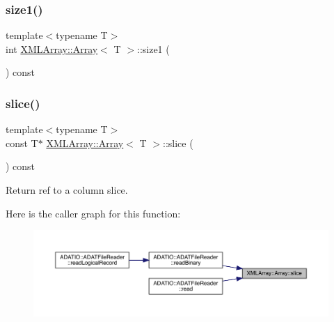 \mbox{\label{classXMLArray_1_1Array_a33e863988af56d045439d31058088c8c}} 
\subsubsection{\texorpdfstring{size1()}{size1()}\hspace{0.1cm}{\footnotesize\ttfamily [2/2]}}
{\footnotesize\ttfamily template$<$typename T$>$ \\
int \mbox{\hyperlink{classXMLArray_1_1Array}{X\+M\+L\+Array\+::\+Array}}$<$ T $>$\+::size1 (\begin{DoxyParamCaption}{ }\end{DoxyParamCaption}) const\hspace{0.3cm}{\ttfamily [inline]}}

\mbox{\label{classXMLArray_1_1Array_a9c9e3fdc44557d1241103c207f7f69af}} 
\subsubsection{\texorpdfstring{slice()}{slice()}\hspace{0.1cm}{\footnotesize\ttfamily [1/2]}}
{\footnotesize\ttfamily template$<$typename T$>$ \\
const T$\ast$ \mbox{\hyperlink{classXMLArray_1_1Array}{X\+M\+L\+Array\+::\+Array}}$<$ T $>$\+::slice (\begin{DoxyParamCaption}{ }\end{DoxyParamCaption}) const\hspace{0.3cm}{\ttfamily [inline]}}



Return ref to a column slice. 

Here is the caller graph for this function\+:
\nopagebreak
\begin{figure}[H]
\begin{center}
\leavevmode
\includegraphics[width=350pt]{db/d6c/classXMLArray_1_1Array_a9c9e3fdc44557d1241103c207f7f69af_icgraph}
\end{center}
\end{figure}
\mbox{\label{classXMLArray_1_1Array_a9c9e3fdc44557d1241103c207f7f69af}} 
